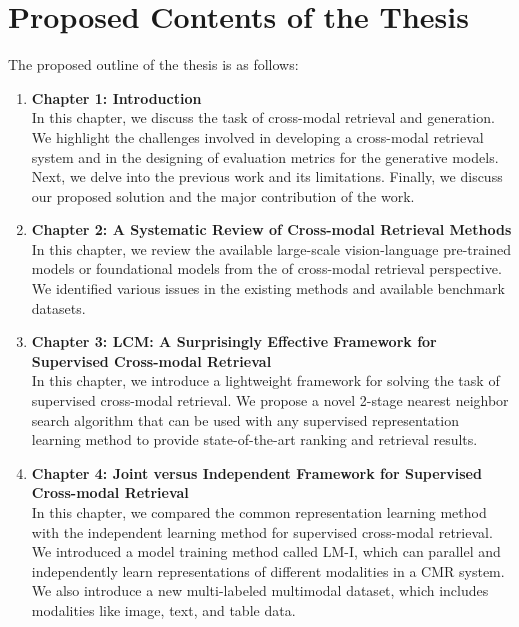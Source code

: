 \section{Proposed Contents of the Thesis}
\label{sec:thesis_outline}
The proposed outline of the thesis is as follows:\\
\begin{enumerate}
\item \textbf{Chapter 1: Introduction}\\
In this chapter, we discuss the task of cross-modal retrieval and generation. We highlight the challenges involved in developing a cross-modal retrieval system and in the designing of evaluation metrics for the generative models. Next, we delve into the previous work and its limitations. Finally, we discuss our proposed solution and the major contribution of the work. \\

\item \textbf{Chapter 2: A Systematic Review of Cross-modal Retrieval Methods}\\
In this chapter, we review the available large-scale vision-language pre-trained models or foundational models from the of cross-modal retrieval perspective. We identified various issues in the existing methods and available benchmark datasets.\\

\item \textbf{Chapter 3: LCM: A Surprisingly Effective Framework for Supervised Cross-modal Retrieval}\\ In this chapter, we introduce a lightweight framework for solving the task of supervised cross-modal retrieval. We propose a novel 2-stage nearest neighbor search algorithm that can be used with any supervised representation learning method to provide state-of-the-art ranking and retrieval results. \\  

\item \textbf{Chapter 4: Joint versus Independent Framework for Supervised Cross-modal Retrieval}\\In this chapter, we compared the common representation learning method with the independent learning method for supervised cross-modal retrieval. We introduced a model training method called LM-I, which can parallel and independently learn representations of different modalities in a CMR system. We also introduce a new multi-labeled multimodal dataset, which includes modalities like image, text, and table data. \\


\end{enumerate}
